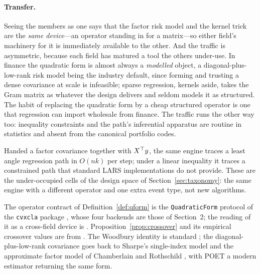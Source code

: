 \paragraph{Transfer.} Seeing the members as one says that the factor risk model and the
kernel trick are the \emph{same device}---an operator standing in for a matrix---so
either field's machinery for it is immediately available to the other. And the traffic
is asymmetric, because each field has matured a tool the others under-use. In finance
the quadratic form is almost always a \emph{modelled} object, a diagonal-plus-low-rank
risk model being the industry default, since forming and trusting a dense covariance at
scale is infeasible; sparse regression, kernels aside, takes the Gram matrix as whatever
the design delivers and seldom models it as structured. The habit of replacing the
quadratic form by a cheap structured operator is one that regression can import
wholesale from finance. The traffic runs the other way too: inequality constraints and
the path's inferential apparatus are routine in statistics and absent from the canonical
portfolio codes.

Handed a factor covariance together with $X^{\top} y$, the same engine traces a least angle
regression path in $O(nk)$ per step; under a linear inequality it traces a constrained
path that standard LARS implementations do not provide. These are the under-occupied
cells of the design space of Section~\ref{sec:taxonomy}: the same engine with a
different operator and one extra event type, not new algorithms.

\begin{notes}
The operator contract of Definition~\ref{def:qform} is the \texttt{QuadraticForm}
protocol of the \texttt{cvxcla} package \cite{cvxcla}, whose four backends are those of
Section~2; the reading of it as a cross-field device is
\cite{schmelzer2026perspective}. Proposition~\ref{prop:crossover} and its empirical
crossover values are from \cite{schmelzer2026rmt}. The Woodbury identity is standard
\cite{golub2013}; the diagonal-plus-low-rank covariance goes back to Sharpe's
single-index model \cite{sharpe1963} and the approximate factor model of Chamberlain
and Rothschild \cite{chamberlain1983}, with POET \cite{fan2013poet} a modern estimator
returning the same form.
\end{notes}

